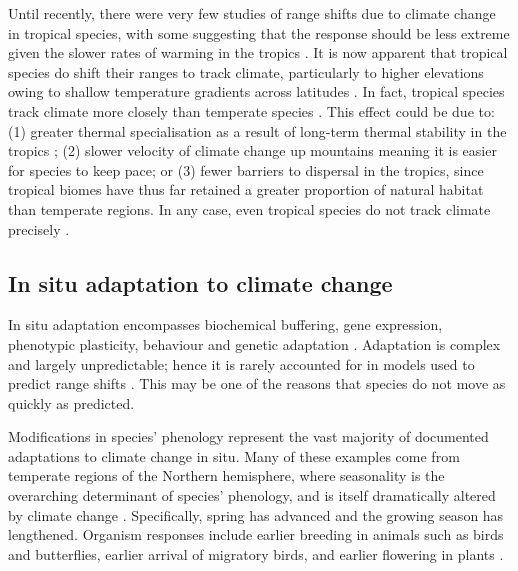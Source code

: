 \documentclass[12pt,a4paper,]{report}
\theoremstyle{definition}
\theoremstyle{definition}
\theoremstyle{definition}
\theoremstyle{remark}
\begin{document}
Until recently, there were very few studies of range shifts due to
climate change in tropical species, with some suggesting that the
response should be less extreme given the slower rates of warming in the
tropics \citep{freeman_rapid2014, ipcc2013}. It is now apparent that
tropical species do shift their ranges to track climate, particularly to
higher elevations \citep{chen_elevation2009, pounds_biological1999}
owing to shallow temperature gradients across latitudes
\citep{colwell_global2008}. In fact, tropical species track climate more
closely than temperate species \citep{freeman_rapid2014}. This effect
could be due to: (1) greater thermal specialisation as a result of
long-term thermal stability in the tropics \citep{freeman_rapid2014};
(2) slower velocity of climate change up mountains
\citep{loarie_velocity2009} meaning it is easier for species to keep
pace; or (3) fewer barriers to dispersal in the tropics, since tropical
biomes have thus far retained a greater proportion of natural habitat
than temperate regions. In any case, even tropical species do not track
climate precisely \citep{chen_elevation2009}.

\subsection{In situ adaptation to climate
change}\label{in-situ-adaptation-to-climate-change}

In situ adaptation encompasses biochemical buffering, gene expression,
phenotypic plasticity, behaviour and genetic adaptation
\citep{peck_organisms2011}. Adaptation is complex and largely
unpredictable; hence it is rarely accounted for in models used to
predict range shifts \citep{peck_organisms2011}. This may be one of the
reasons that species do not move as quickly as predicted.

Modifications in species' phenology represent the vast majority of
documented adaptations to climate change in situ. Many of these examples
come from temperate regions of the Northern hemisphere, where
seasonality is the overarching determinant of species' phenology, and is
itself dramatically altered by climate change
\citep{bradshaw_evolutionary2006}. Specifically, spring has advanced and
the growing season has lengthened. Organism responses include earlier
breeding in animals such as birds and butterflies, earlier arrival of
migratory birds, and earlier flowering in plants
\citep{walther_ecological2002}.
\end{document}
